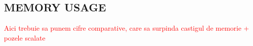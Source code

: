 \documentclass[a4paper,twoside]{article}
\begin{document}
\subsection{\uppercase{Memory Usage}}
\textcolor{red} {Aici trebuie sa punem cifre comparative, care sa surpinda castigul de memorie + pozele scalate }

\end{document}
